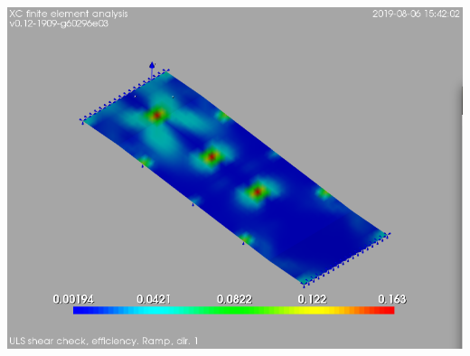 \begin{Figure}
    \includegraphics[width=\linewidth]{ramp/figures/CF_shear_trans}
    \label{ramp_CF_shear_trans}
\end{Figure}


